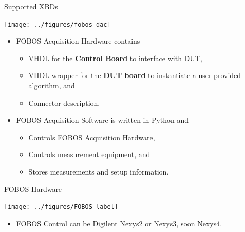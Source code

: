 \documentclass[xcolor=pdftex,dvipsnames,table,final]{beamer}
\begin{document}
\begin{frame}[fragile]{}
\begin{columns}[t]
\begin{column}{.31\linewidth}
\begin{block}{Supported XBDs}
        \begin{center}
          \texttt{[image: ../figures/fobos-dac]}
        \end{center} 

          \begin{itemize}
            \item FOBOS Acquisition Hardware contains 
            \begin{itemize}
              \item VHDL for the \textbf{Control Board} to interface with DUT,
              \item VHDL-wrapper for the \textbf{DUT board} to instantiate a user provided algorithm, and
              \item Connector description.
            \end{itemize}
            \item FOBOS Acquisition Software is written in Python and 
            \begin{itemize}
              \item Controls FOBOS Acquisition Hardware,
              \item Controls measurement equipment, and
              \item Stores measurements and setup information.
            \end{itemize}
          \end{itemize}
       \end{block}
     
      \begin{block}{FOBOS Hardware}
        \vspace{-1ex}
        \begin{center}
          \texttt{[image: ../figures/FOBOS-label]}
        \end{center} 
        \begin{itemize}
          \item FOBOS Control can be Digilent Nexys2 or Nexys3, soon Nexys4.
        \end{itemize}
        \vspace{-0.2ex}
       \end{block}
     

\end{column}
\end{columns}
\end{frame}
\end{document}
